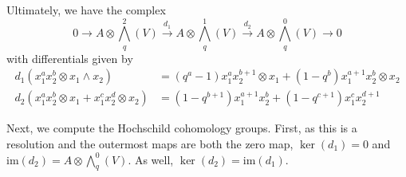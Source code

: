 \documentclass[12pt,a4paper]{article}
\newcommand{\Wedge}{\textstyle\bigwedge}
\newcommand\1{_{(1)}}
\newcommand\2{_{(2)}}
\begin{document}
Ultimately, we have the complex
\[
0 \to A\otimes \Wedge_q^2(V)\xrightarrow{d_1}A\otimes \Wedge_q^1(V)\xrightarrow{d_2}A\otimes \Wedge_q^0(V)\to 0
\]
with differentials given by
\begin{align*}
d_1(x_1^ax_2^b\otimes x_1\wedge x_2)&=(q^a-1)x_1^ax_2^{b+1}\otimes x_1+(1-q^b)x_1^{a+1}x_2^b\otimes x_2\\
d_2(x_1^ax_2^b\otimes x_1+x_1^cx_2^d\otimes x_2)&=(1-q^{b+1})x_1^{a+1}x_2^b+(1-q^{c+1})x_1^cx_2^{d+1}
\end{align*}

Next, we compute the Hochschild cohomology groups. 
First, as this is a resolution and the outermost maps are both the zero map, $\ker(d_1)=0$ and $\text{im}(d_2)=A\otimes \Wedge_q^0 (V)$.
As well, $\ker(d_2)=\text{im}(d_1)$.
\end{document}
